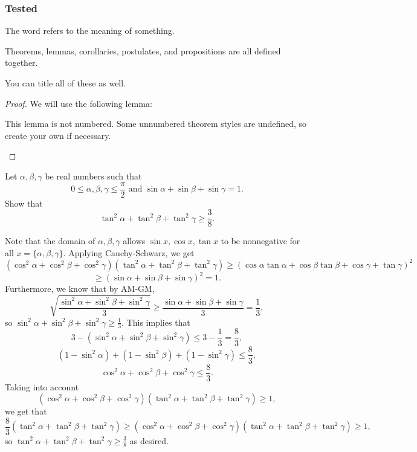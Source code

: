 \documentclass[twoside]{article}
\begin{document}
\subsubsection{Tested}
\begin{defn}[Definition]
The word  refers to the meaning of something.
\end{defn}
\begin{theorem}
Theorems, lemmas, corollaries, postulates, and propositions are all defined together. 
\end{theorem}
\begin{lemma}
You can title all of these as well.
\end{lemma}
\begin{corollary}

\end{corollary}
\begin{postulate}

\end{postulate}
\begin{prop}

\end{prop}
\begin{proof}
We will use the following lemma:
\begin{lemma*}
This lemma is not numbered. Some unnumbered theorem styles are undefined, so create your own if necessary.
\end{lemma*}
\end{proof}
\begin{example}
Let $\alpha,\beta,\gamma$ be real numbers such that 
$$0\le \alpha,\beta,\gamma \le \frac{\pi}{2} \text{ and } \sin\alpha+\sin\beta+\sin\gamma=1.$$
Show that
$$\tan^2\alpha+\tan^2\beta+\tan^2\gamma\ge \frac{3}{8}.$$
\end{example}
\begin{soln}
Note that the domain of $\alpha,\beta,\gamma$ allows $\sin x,\cos x,\tan x$ to be nonnegative for all $x=\{\alpha,\beta,\gamma\}$. Applying Cauchy-Schwarz, we get
$$(\cos^2\alpha+\cos^2\beta+\cos^2\gamma)(\tan^2\alpha+\tan^2\beta+\tan^2\gamma)\ge (\cos\alpha\tan\alpha+\cos\beta\tan\beta+\cos\gamma+\tan\gamma)^2$$
$$\ge (\sin\alpha+\sin\beta+\sin\gamma)^2 = 1.$$
Furthermore, we know that by AM-GM,
$$\sqrt{\frac{\sin^2\alpha+\sin^2\beta+\sin^2\gamma}{3}} \ge \frac{\sin\alpha+\sin\beta+\sin\gamma}{3} = \frac{1}{3},$$
so $\sin^2\alpha+\sin^2\beta+\sin^2\gamma\ge \frac{1}{3}$. This implies that
$$3-(\sin^2\alpha+\sin^2\beta+\sin^2\gamma)\le 3-\frac{1}{3}=\frac{8}{3},$$
$$(1-\sin^2\alpha)+(1-\sin^2\beta)+(1-\sin^2\gamma)\le \frac{8}{3},$$
$$\cos^2\alpha+\cos^2\beta+\cos^2\gamma \le \frac{8}{3}.$$
Taking into account
$$(\cos^2\alpha+\cos^2\beta+\cos^2\gamma)(\tan^2\alpha+\tan^2\beta+\tan^2\gamma)\ge 1,$$
we get that
$$\frac{8}{3} (\tan^2\alpha+\tan^2\beta+\tan^2\gamma) \ge (\cos^2\alpha+\cos^2\beta+\cos^2\gamma)(\tan^2\alpha+\tan^2\beta+\tan^2\gamma)\ge 1,$$
so $\tan^2\alpha+\tan^2\beta+\tan^2\gamma\ge \frac{3}{8}$ as desired.
\end{soln}
\end{document}
